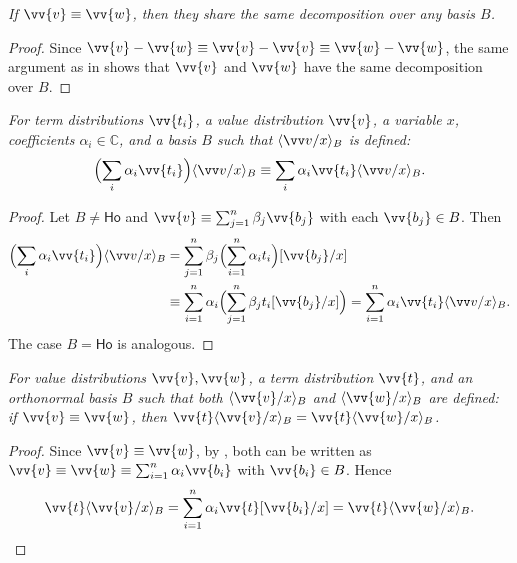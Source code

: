 \documentclass[runningheads,orivec,envcountsame,envcountsect]{llncs}
\newcommand\ansubst[2]{\ensuremath{\langle #1 \rangle_{#2}}}
\newcommand\AbsBasis{\ensuremath{\mathsf{Ho}}}
\def\C{\mathbb{C}}            %
\begin{document}
\begin{restatecorollary}
  \itshape
  If $\vv{v}\equiv\vv{w}$, then they share the same decomposition over any
  basis $B$.
\end{restatecorollary}
\begin{proof}
  Since $\vv{v}-\vv{w}\equiv\vv{v}-\vv{v}\equiv\vv{w}-\vv{w}$, the same
  argument as in  shows that $\vv{v}$ and $\vv{w}$ have the
  same decomposition over $B$.
\end{proof}

\begin{restatelemma}
  \itshape
  For term distributions $\vv{t_i}$, a value distribution $\vv{v}$, a
  variable $x$, coefficients $\alpha_i\in\C$, and a basis $B$ such that
  $\ansubst{\vv v/x}{B}$ is defined:
  \[
    \Bigl(\sum_i \alpha_i\vv{t_i}\Bigr)\ansubst{\vv v/x}{B}
    \equiv
    \sum_i \alpha_i\vv{t_i} \ansubst{\vv v/x}{B}.
  \]
\end{restatelemma}
\begin{proof}
  Let $B\neq\AbsBasis$ and
  $\vv{v}\equiv\sum_{j=1}^n\beta_j\vv{b_j}$ with each $\vv{b_j}\in B$.
  Then
  \begin{align*}
    \Bigl(\sum_i \alpha_i\vv{t_i}\Bigr)\ansubst{\vv v/x}{B}
    &= \sum_{j=1}^n \beta_j\Bigl(\sum_{i=1}^{n}\alpha_i t_i\Bigr)[\vv{b_j}/x]\\
    &\equiv \sum_{i=1}^{n}\alpha_i\Bigl(\sum_{j=1}^n\beta_j t_i[\vv{b_j}/x]\Bigr)
    = \sum_{i=1}^{n}\alpha_i\vv{t_i}\ansubst{\vv v/x}{B}.
  \end{align*}
  The case $B=\AbsBasis$ is analogous.
\end{proof}

\begin{restatelemma}
  \itshape
  For value distributions $\vv{v},\vv{w}$, a term distribution $\vv{t}$, and
  an orthonormal basis $B$ such that both
  $\ansubst{\vv{v}/x}{B}$ and $\ansubst{\vv{w}/x}{B}$ are defined:
  if $\vv{v}\equiv\vv{w}$, then
  $\vv{t}\ansubst{\vv{v}/x}{B}
  =\vv{t}\ansubst{\vv{w}/x}{B}$.
\end{restatelemma}
\begin{proof}
  Since $\vv{v}\equiv\vv{w}$, by
  ,
  both can be written as
  $\vv{v}\equiv\vv{w}\equiv\sum_{i=1}^{n}\alpha_i\vv{b_i}$ with
  $\vv{b_i}\in B$. Hence
  \[
    \vv{t}\ansubst{\vv{v}/x}{B}
    = \sum_{i=1}^{n}\alpha_i\vv{t}[\vv{b_i}/x]
    = \vv{t}\ansubst{\vv{w}/x}{B}.
  \]
\end{proof}
\end{document}
